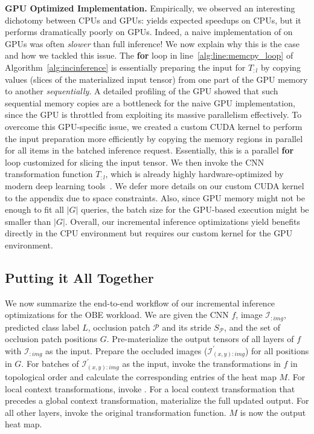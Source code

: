 \vspace{2mm}
\noindent \textbf{GPU Optimized Implementation.}
Empirically, we observed an interesting dichotomy between CPUs and GPUs:  yields expected speedups on CPUs, but it performs dramatically poorly on GPUs. Indeed, a naive implementation of  on GPUs was often \textit{slower} than full inference! We now explain why this is the case and how we tackled this issue. The \textbf{for} loop in line~\ref{alg:line:memcpy_loop} of Algorithm~\ref{alg:incinference} is essentially preparing the input for $T_{:l}$ by copying values (slices of the materialized input tensor) from one part of the GPU memory to another \textit{sequentially}. A detailed profiling of the GPU showed that such sequential memory copies are a bottleneck for the naive GPU implementation, since the GPU is throttled from exploiting its massive parallelism effectively. To overcome this GPU-specific issue, we created a custom CUDA kernel to perform the input preparation more efficiently by copying the memory regions in parallel for all items in the batched inference request. Essentially, this is a parallel \textbf{for} loop customized for slicing the input tensor. We then invoke the CNN transformation function $T_{:l}$, which is already highly hardware-optimized by modern deep learning tools~\cite{chetlur2014cudnn}. We defer more details on our custom CUDA kernel to the appendix due to space constraints. Also, since GPU memory might not be enough to fit all $|G|$ queries, the batch size for the GPU-based execution might be smaller than $|G|$. Overall, our incremental inference optimizations yield benefits directly in the CPU environment but requires our custom kernel for the GPU environment.


\subsection{Putting it All Together}

We now summarize the end-to-end workflow of our incremental inference optimizations for the OBE workload.
We are given the CNN $f$, image $\mathcal{I}_{:img}$, predicted class label $L$, occlusion patch $\mathcal{P}$ and its stride $S_{\mathcal{P}}$, and the set of occlusion patch positions $G$.
Pre-materialize the output tensors of all layers of $f$ with $\mathcal{I}_{:img}$ as the input.
Prepare the occluded images ($\mathcal{I}^{'}_{(x,y):img}$) for all positions in $G$.
For batches of $\mathcal{I}^{'}_{(x,y):img}$ as the input, invoke the transformations in $f$ in topological order and calculate the corresponding entries of the heat map $M$.
For local context transformations, invoke .
For a local context transformation that precedes a global context transformation, materialize the full updated output.
For all other layers, invoke the original transformation function.
$M$ is now the output heat map.


